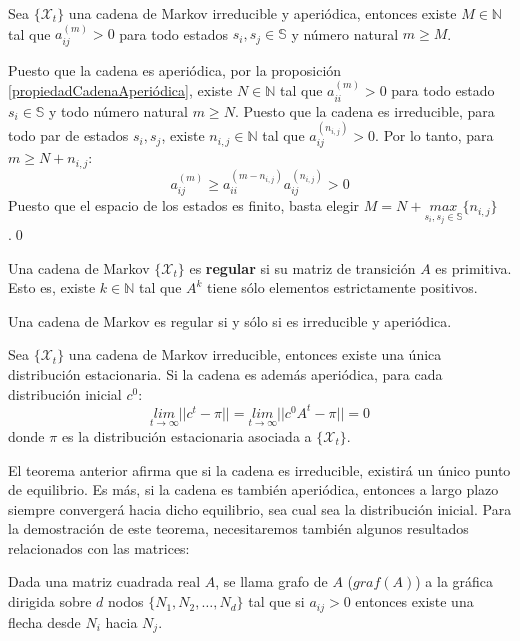 \begin{proposition}\label{propiedadCadenaIrreducibleAperiódica}
    Sea $\{\mathcal{X}_t\}$ una cadena de Markov irreducible y aperiódica, entonces existe $M\in\mathbb{N}$ tal que $a_{ij}^{(m)}>0$ para todo estados $s_i, s_j\in\mathbb{S}$ y número natural $m\geq M$.
\end{proposition}
\begin{proofs*}
Puesto que la cadena es aperiódica, por la proposición \ref{propiedadCadenaAperiódica}, existe $N\in\mathbb{N}$ tal que $a_{ii}^{(m)}>0$ para todo estado $s_i\in\mathbb{S}$ y todo número natural $m\geq N$.
Puesto que la cadena es irreducible, para todo par de estados $s_i, s_j$, existe $n_{i,j}\in\mathbb{N}$ tal que $a_{ij}^{(n_{i,j})}>0$. Por lo tanto, para $m\geq N+n_{i,j}$:
\[a_{ij}^{(m)}\geq a_{ii}^{(m-n_{i,j})}a_{ij}^{(n_{i,j})}>0\]
Puesto que el espacio de los estados es finito, basta elegir $M=N+\underset{s_i,s_j\in\mathbb{S}}{max}\{n_{i,j}\}$.\qed
\end{proofs*}

\begin{definition}
Una cadena de Markov $\{\mathcal{X}_t\}$ es \textbf{regular} si su matriz de transición $A$ es primitiva. Esto es, existe $k\in\mathbb{N}$ tal que $A^k$ tiene sólo elementos estrictamente positivos.
\end{definition}

\begin{corollary}
    Una cadena de Markov es regular si y sólo si es irreducible y aperiódica.
\end{corollary}

\begin{theorem}\label{ComportamientoAsintóticoMarkovIrreducible}
    Sea $\{\mathcal{X}_t\}$ una cadena de Markov irreducible, entonces existe una única distribución estacionaria. Si la cadena es además aperiódica, para cada distribución inicial $c^0$:
    \[\underset{t\rightarrow\infty}{lim}||c^t-\pi||=\underset{t\rightarrow\infty}{lim}||c^0A^t-\pi||=0\]
    donde $\pi$ es la distribución estacionaria asociada a $\{\mathcal{X}_t\}$.
\end{theorem}

El teorema anterior afirma que si la cadena es irreducible, existirá un único punto de equilibrio. Es más, si la cadena es también aperiódica, entonces a largo plazo siempre convergerá hacia dicho equilibrio, sea cual sea la distribución inicial. Para la demostración de este teorema, necesitaremos también algunos resultados relacionados con las matrices:
\begin{definition}
Dada una matriz cuadrada real $A$, se llama grafo de $A$ ($graf(A)$) a la gráfica dirigida sobre $d$ nodos $\{N_1, N_2, \dots,N_d\}$ tal que si $a_{ij}>0$ entonces existe una flecha desde $N_i$ hacia $N_j$.
\end{definition}

